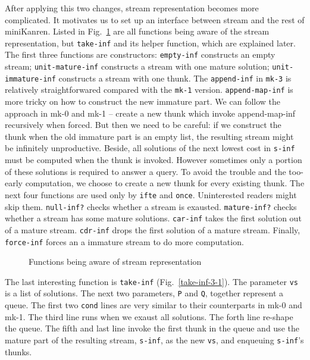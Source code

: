 \documentclass[format=acmlarge, review=true, authordraft=true]{acmart}
\begin{document}
After applying this two changes, stream representation becomes more 
complicated. It motivates us to set up an interface between stream 
and the rest of miniKanren. Listed in Fig.~\ref{interface} are all functions 
being aware of the stream representation, but \texttt{take-inf} and its helper 
function, which are explained later. The first three functions are 
constructors: 
\texttt{empty-inf} constructs an empty stream; \texttt{unit-mature-inf} 
constructs a stream with one mature solution; \texttt{unit-immature-inf} 
constructs a stream with one thunk. The \texttt{append-inf} in \texttt{mk-3} is 
relatively straightforwared compared with the \texttt{mk-1} version. 
\texttt{append-map-inf} is more tricky on how to construct the new immature 
part. We can follow the approach in mk-0 and mk-1 -- create a new thunk which 
invoke append-map-inf recursively when forced. But then we need to be careful: 
if we construct the thunk when the old immature part is an empty list, the 
resulting stream might be infinitely unproductive. Beside, all solutions of the 
next lowest cost in \texttt{s-inf} must be computed when the thunk is invoked. 
However sometimes only a portion of these solutions is required to answer a 
query. To avoid the trouble and the too-early computation, we choose to create 
a new thunk for every existing thunk. The next four functions are used only by 
\texttt{ifte} and \texttt{once}. Uninterested readers might skip them. 
\texttt{null-inf?} checks whether a stream is exausted. \texttt{mature-inf?} 
checks whether a stream has some mature solutions. \texttt{car-inf} takes the 
first solution out of a mature stream. \texttt{cdr-inf} drops the first 
solution of a mature stream. Finally, \texttt{force-inf} forces an a immature 
stream to do more computation.

\begin{figure}
	 	
	 \caption{Functions being aware of stream representation}
	 \label{interface}
\end{figure}

The last interesting function is \texttt{take-inf} (Fig.~\ref{take-inf-3-1}). 
The parameter \texttt{vs} is a list of solutions. The next two parameters, 
\texttt{P} and \texttt{Q}, together represent a queue. The first two 
\texttt{cond} lines are very similar to their counterparts in mk-0 and mk-1. 
The third line runs when we exaust all solutions. The forth line re-shape the 
queue. The fifth and last line invoke the first thunk in the queue and use the 
mature part of the resulting stream, \texttt{s-inf}, as the new \texttt{vs}, 
and enqueuing \texttt{s-inf}'s thunks. 
\end{document}
